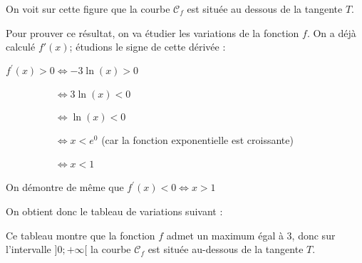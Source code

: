 \begin{corrige}
On voit sur cette figure que la courbe $\mathcal{C}_f$ est située au dessous de la tangente $T$.
\par
Pour prouver ce résultat, on va étudier les variations de la fonction $f$. On a déjà calculé $f'(x)$; étudions le signe de cette dérivée :
\par
$f^{\prime}(x)  > 0 \Leftrightarrow -3\ln(x)  > 0 $
\par
$\phantom{f^{\prime}(x)  > 0 }\Leftrightarrow 3\ln(x)  < 0 $
\par
$\phantom{f^{\prime}(x)  > 0 }\Leftrightarrow \ln(x)  < 0 $
\par
$\phantom{f^{\prime}(x)  > 0 }\Leftrightarrow x  < e^0 $ (car la fonction exponentielle est croissante)
\par
$\phantom{f^{\prime}(x)  > 0 }\Leftrightarrow x  < 1 $
\par
On démontre de même que $f^{\prime}(x)  < 0 \Leftrightarrow x  > 1$
\par
On obtient donc le tableau de variations suivant :
\begin{center}
\end{center}
Ce tableau montre que la fonction $f$ admet un maximum égal à $3$, donc sur l'intervalle $]0;+\infty[$ la courbe $\mathcal{C}_f$ est située au-dessous de la tangente $T$.
\end{corrige}
